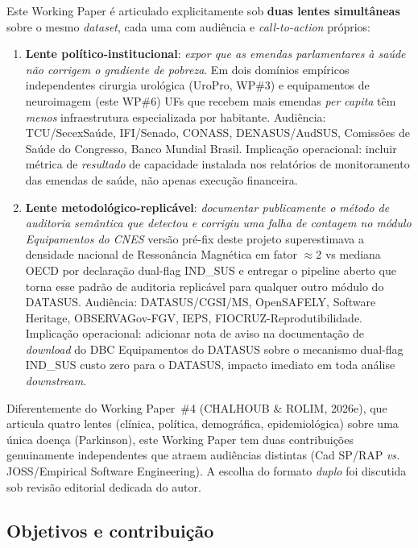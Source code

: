 \documentclass[12pt,a4paper,oneside]{article}
\begin{document}
Este Working Paper é articulado explicitamente sob \textbf{duas
lentes simultâneas} sobre o mesmo
\textit{dataset}, cada uma com audiência e \textit{call-to-action}
próprios:

\begin{enumerate}
\item[\textbf{(i)}] \textbf{Lente político-institucional}:
\textit{expor que as emendas parlamentares à saúde não corrigem o
gradiente de pobreza}. Em dois domínios empíricos independentes
\textemdash{} cirurgia urológica (UroPro, WP\#3) e equipamentos de
neuroimagem (este WP\#6) \textemdash{} UFs que recebem mais emendas
\textit{per capita} têm \textit{menos} infraestrutura especializada
por habitante. Audiência: TCU/SecexSaúde, IFI/Senado, CONASS,
DENASUS/AudSUS, Comissões de Saúde do Congresso, Banco Mundial
Brasil. Implicação operacional: incluir métrica de \textit{resultado}
de capacidade instalada nos relatórios de monitoramento das emendas
de saúde, não apenas execução financeira.

\item[\textbf{(ii)}] \textbf{Lente metodológico-replicável}:
\textit{documentar publicamente o método de auditoria semântica que
detectou e corrigiu uma falha de contagem no módulo Equipamentos do
CNES} \textemdash{} versão pré-fix deste projeto superestimava a
densidade nacional de Ressonância Magnética em fator $\approx$2 vs
mediana OECD por declaração dual-flag IND\_SUS \textemdash{} e
entregar o pipeline aberto que torna esse padrão de auditoria
replicável para qualquer outro módulo do DATASUS. Audiência:
DATASUS/CGSI/MS, OpenSAFELY, Software Heritage, OBSERVAGov-FGV,
IEPS, FIOCRUZ-Reprodutibilidade. Implicação operacional: adicionar
nota de aviso na documentação de \textit{download} do DBC
Equipamentos do DATASUS sobre o mecanismo dual-flag IND\_SUS \textemdash{}
custo zero para o DATASUS, impacto imediato em toda análise
\textit{downstream}.
\end{enumerate}

\noindent
Diferentemente do Working Paper~\#4 (CHALHOUB \& ROLIM, 2026e), que
articula quatro lentes (clínica, política, demográfica,
epidemiológica) sobre uma única doença (Parkinson), este Working
Paper tem duas contribuições genuinamente independentes que atraem
audiências distintas (Cad SP/RAP \textit{vs.} JOSS/Empirical
Software Engineering). A escolha do formato \textit{duplo} foi
discutida sob revisão editorial dedicada do autor.

\subsection{Objetivos e contribuição}
\end{document}
